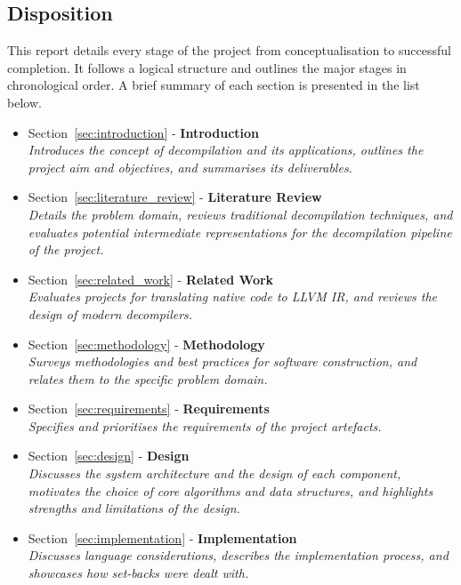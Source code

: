 
\subsection{Disposition}

This report details every stage of the project from conceptualisation to successful completion. It follows a logical structure and outlines the major stages in chronological order. A brief summary of each section is presented in the list below.

\begin{itemize}
	\item Section~\ref{sec:introduction} - \textbf{Introduction} \\ \textit{Introduces the concept of decompilation and its applications, outlines the project aim and objectives, and summarises its deliverables.}
	\item Section~\ref{sec:literature_review} - \textbf{Literature Review} \\ \textit{Details the problem domain, reviews traditional decompilation techniques, and evaluates potential intermediate representations for the decompilation pipeline of the project.}
	\item Section~\ref{sec:related_work} - \textbf{Related Work} \\ \textit{Evaluates projects for translating native code to LLVM IR, and reviews the design of modern decompilers.}
	\item Section~\ref{sec:methodology} - \textbf{Methodology} \\ \textit{Surveys methodologies and best practices for software construction, and relates them to the specific problem domain.}
	\item Section~\ref{sec:requirements} - \textbf{Requirements} \\ \textit{Specifies and prioritises the requirements of the project artefacts.}
	\item Section~\ref{sec:design} - \textbf{Design} \\ \textit{Discusses the system architecture and the design of each component, motivates the choice of core algorithms and data structures, and highlights strengths and limitations of the design.}
	\item Section~\ref{sec:implementation} - \textbf{Implementation} \\ \textit{Discusses language considerations, describes the implementation process, and showcases how set-backs were dealt with.}

\end{itemize}
